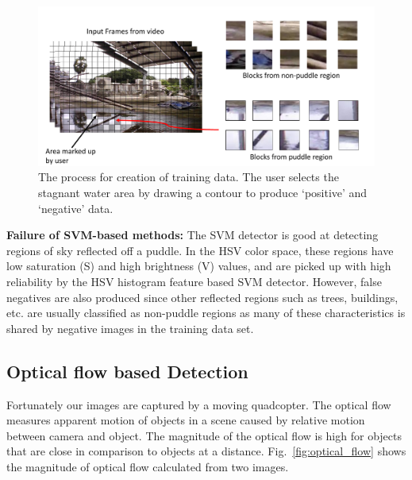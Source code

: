 \begin{figure}[h!]
  \centering
  \includegraphics[width=0.9\linewidth]{figures/stagnantWater/trainingData.pdf}
  \caption[Creation of Training Data]{The process for creation of training data.
  The user selects the stagnant water area by drawing a contour to produce `positive'
    and `negative'  data.}
  \label{fig:training}
\end{figure}

\textbf{Failure of SVM-based methods:} The SVM detector is good at
detecting regions of sky reflected off a puddle.  In the HSV color
space, these regions have low saturation (S) and high brightness (V)
values, and are picked up with high reliability by the HSV histogram
feature based SVM detector. However, false negatives are also produced
since other reflected regions such as trees, buildings, etc. are
usually classified as non-puddle regions as many of these
characteristics is shared by negative images in the training data set.


\subsection{Optical flow based Detection}
Fortunately our images are captured by a moving quadcopter.  The
optical flow measures apparent motion of objects in a scene caused by
relative motion between camera and object. The magnitude of the
optical flow is high for objects that are close in comparison to
objects at a distance.  Fig.~\ref{fig:optical_flow} shows the
magnitude of optical flow calculated from two images.

